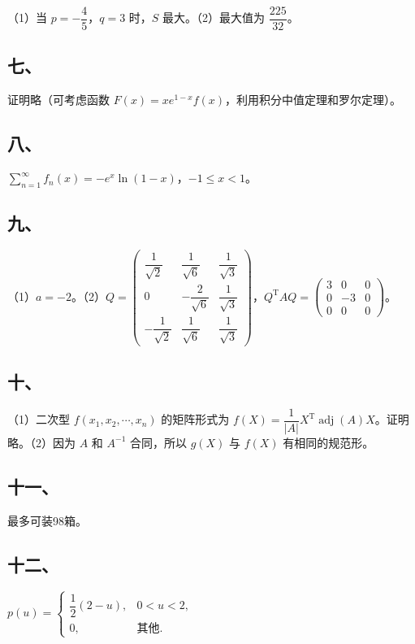 \documentclass[UTF8,12pt]{ctexart}
\begin{document}
（1）当 \(\displaystyle p=-\dfrac{\displaystyle 4}{\displaystyle 5}\)，\(\displaystyle q=3\) 时，\(\displaystyle S\) 最大。（2）最大值为 \(\displaystyle \dfrac{\displaystyle 225}{\displaystyle 32}\)。


\subsection*{七、}

证明略（可考虑函数 \(\displaystyle F(x)=xe^{1-x}f(x)\)，利用积分中值定理和罗尔定理）。


\subsection*{八、}

\(\displaystyle \sum_{n=1}^{\infty}f_n(x)=-e^x\ln(1-x)\)，\(\displaystyle -1\le x<1\)。


\subsection*{九、}

（1）\(\displaystyle a=-2\)。（2）\(\displaystyle Q=\begin{pmatrix}\dfrac{\displaystyle 1}{\displaystyle \sqrt2}&\dfrac{\displaystyle 1}{\displaystyle \sqrt6}&\dfrac{\displaystyle 1}{\displaystyle \sqrt3}\\0&-\dfrac{\displaystyle 2}{\displaystyle \sqrt6}&\dfrac{\displaystyle 1}{\displaystyle \sqrt3}\\-\dfrac{\displaystyle 1}{\displaystyle \sqrt2}&\dfrac{\displaystyle 1}{\displaystyle \sqrt6}&\dfrac{\displaystyle 1}{\displaystyle \sqrt3}\end{pmatrix}\)，\(\displaystyle Q^{\mathrm T}AQ=\begin{pmatrix}3&0&0\\0&-3&0\\0&0&0\end{pmatrix}\)。


\subsection*{十、}

（1）二次型 \(\displaystyle f(x_1,\allowbreak x_2,\allowbreak \cdots,\allowbreak x_n)\) 的矩阵形式为 \(\displaystyle f(X)=\dfrac{\displaystyle 1}{\displaystyle |A|}X^{\mathrm T}\operatorname{adj}(A)X\)。证明略。（2）因为 \(\displaystyle A\) 和 \(\displaystyle A^{-1}\) 合同，所以 \(\displaystyle g(X)\) 与 \(\displaystyle f(X)\) 有相同的规范形。


\subsection*{十一、}

最多可装98箱。


\subsection*{十二、}

\(\displaystyle p(u)=\begin{cases}\dfrac{\displaystyle 1}{\displaystyle 2}(2-u),\allowbreak &0<u<2,\allowbreak \\0,\allowbreak &\text{其他}.\end{cases}\)
\end{document}
